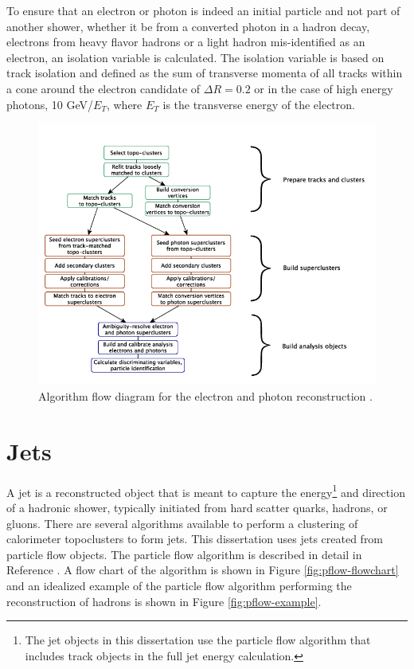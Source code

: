 		To ensure that an electron or photon is indeed an initial particle and not part of another shower, whether it be from a converted photon in a hadron decay, electrons from heavy flavor hadrons or a light hadron mis-identified as an electron, an isolation variable is calculated. The isolation variable is based on track isolation and defined as the sum of transverse momenta of all tracks within a cone around the electron candidate of $\Delta R = 0.2$ or in the case of high energy photons, 10 GeV/$E_T$, where $E_T$ is the transverse energy of the electron.

		\begin{figure}[!ht]
		\centering
		\includegraphics[width=.65\textwidth,keepaspectratio=true]{chapters/chapter5_eventreconnstruction/images/egamma_flow_01.png}
		\caption{\label{fig:egamma-reco} Algorithm flow diagram for the electron and photon reconstruction \cite{electron-perf}.}
		\end{figure}

	\section{Jets}\label{sec:reco-jets}
		A jet is a reconstructed object that is meant to capture the energy\footnote{The jet objects in this dissertation use the particle flow algorithm that includes track objects in the full jet energy calculation.} and direction of a hadronic shower, typically initiated from hard scatter quarks, hadrons, or gluons. There are several algorithms available to perform a clustering of calorimeter topoclusters to form jets. This dissertation uses jets created from particle flow objects. The particle flow algorithm is described in detail in Reference \cite{pflow}. A flow chart of the algorithm is shown in Figure \ref{fig:pflow-flowchart} and an idealized example of the particle flow algorithm performing the reconstruction of hadrons is shown in Figure \ref{fig:pflow-example}. 

